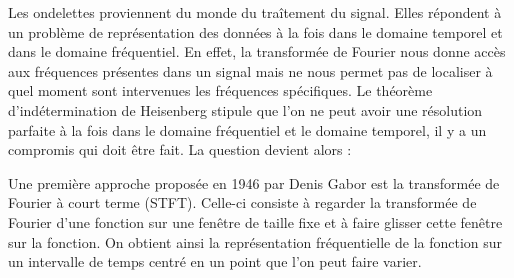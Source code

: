 
Les ondelettes proviennent du monde du traîtement du signal. Elles répondent à un problème de représentation des données à la fois dans le domaine temporel et dans le domaine fréquentiel. En effet, la transformée de Fourier nous donne accès aux fréquences présentes dans un signal mais ne nous permet pas de localiser à quel moment sont intervenues les fréquences spécifiques. Le théorème d'indétermination de Heisenberg stipule que l'on ne peut avoir une résolution parfaite à la fois dans le domaine fréquentiel et le domaine temporel, il y a un compromis qui doit être fait. La question devient alors :


Une première approche proposée en
1946 par Denis Gabor
est la transformée de Fourier à court terme (STFT). Celle-ci consiste à regarder la transformée de Fourier d'une fonction sur une fenêtre de taille fixe et à faire glisser cette fenêtre sur la fonction. On obtient ainsi la représentation fréquentielle de la fonction sur un intervalle de temps centré en un point que l'on peut faire varier.

\bigskip

